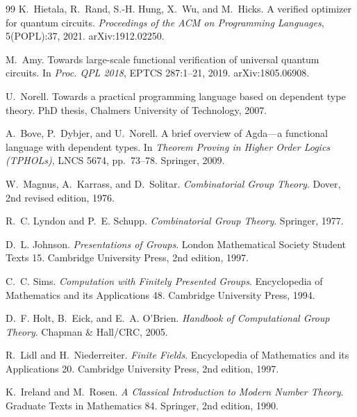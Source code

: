 \documentclass[sigplan,screen,review,anonymous]{acmart}
\begin{document}
\begin{thebibliography}{99}
K.~Hietala, R.~Rand, S.-H. Hung, X.~Wu, and M.~Hicks.
\newblock A verified optimizer for quantum circuits.
\newblock \emph{Proceedings of the ACM on Programming Languages},
  5(POPL):37, 2021.
\newblock arXiv:1912.02250.

M.~Amy.
\newblock Towards large-scale functional verification of universal quantum
  circuits.
\newblock In \emph{Proc. QPL 2018}, EPTCS 287:1--21, 2019.
\newblock arXiv:1805.06908.

U.~Norell.
\newblock Towards a practical programming language based on dependent type
  theory.
\newblock PhD thesis, Chalmers University of Technology, 2007.

A.~Bove, P.~Dybjer, and U.~Norell.
\newblock A brief overview of Agda---a functional language with dependent
  types.
\newblock In \emph{Theorem Proving in Higher Order Logics (TPHOLs)}, LNCS 5674,
  pp.~73--78. Springer, 2009.

W.~Magnus, A.~Karrass, and D.~Solitar.
\newblock \emph{Combinatorial Group Theory}.
\newblock Dover, 2nd revised edition, 1976.

R.~C. Lyndon and P.~E. Schupp.
\newblock \emph{Combinatorial Group Theory}.
\newblock Springer, 1977.

D.~L. Johnson.
\newblock \emph{Presentations of Groups}.
\newblock London Mathematical Society Student Texts 15. Cambridge University
  Press, 2nd edition, 1997.

C.~C. Sims.
\newblock \emph{Computation with Finitely Presented Groups}.
\newblock Encyclopedia of Mathematics and its Applications 48. Cambridge
  University Press, 1994.

D.~F. Holt, B.~Eick, and E.~A. O'Brien.
\newblock \emph{Handbook of Computational Group Theory}.
\newblock Chapman \& Hall/CRC, 2005.

R.~Lidl and H.~Niederreiter.
\newblock \emph{Finite Fields}.
\newblock Encyclopedia of Mathematics and its Applications 20. Cambridge
  University Press, 2nd edition, 1997.

K.~Ireland and M.~Rosen.
\newblock \emph{A Classical Introduction to Modern Number Theory}.
\newblock Graduate Texts in Mathematics 84. Springer, 2nd edition, 1990.

\end{thebibliography}
\end{document}

